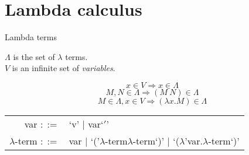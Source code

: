 \documentclass{beamer}
\begin{document}
\section{Lambda calculus}

\begin{frame}{Lambda terms}

  { \color{gmitred}
    \begin{center}
      {\Large  $\Lambda$ is the set of $\lambda$ terms.} \\[3mm]
      $V$ is an infinite set of \emph{variables}.
    \end{center}
  }

  \vspace{-6mm}

  \[ x \in V \Rightarrow x \in \Lambda \]
  \[ M, N \in \Lambda \Rightarrow (M \  N) \in \Lambda \]
  \[ M \in \Lambda, x \in V \Rightarrow (\lambda x.M ) \in \Lambda \]

  { \color{gmitblue}
    \begin{center}
      \begin{table}
        \begin{tabular}{rl}
          var $::=$ & `v' $\mid$ var`$'$' \\[2mm]
          $\lambda$-term $::=$ & var  $\mid$ `('$\lambda$-term$\lambda$-term`)'  $\mid$ `($\lambda$'var.$\lambda$-term`)'
        \end{tabular}
      \end{table}
    \end{center}
  }

\end{frame}
\end{document}
